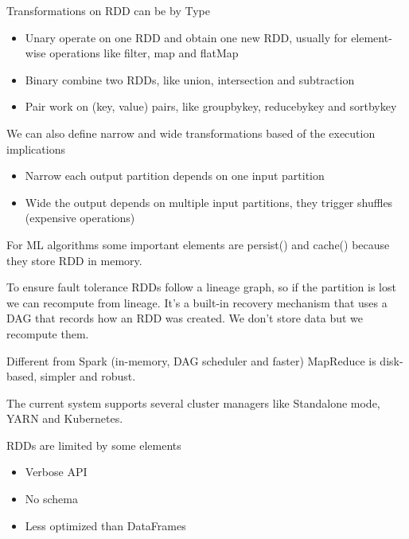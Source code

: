 \vspace{10pt}

Transformations on RDD can be by Type
\begin{itemize}
    \item Unary \ra operate on one RDD and obtain one new RDD, usually for element-wise operations like filter, map and flatMap
    \item Binary \ra combine two RDDs, like union, intersection and subtraction
    \item Pair \ra work on (key, value) pairs, like groupbykey, reducebykey and sortbykey
\end{itemize}

We can also define narrow and wide transformations based of the execution implications

\begin{itemize}
    \item Narrow \ra each output partition depends on one input partition
    \item Wide \ra the output depends on multiple input partitions, they trigger shuffles (expensive operations)
\end{itemize}


For ML algorithms some important elements are persist() and cache() because they store RDD in memory. 

\vspace{10pt}

To ensure fault tolerance RDDs follow a lineage graph, so if the partition is lost we can recompute from lineage. It's a built-in recovery mechanism that uses a DAG that records how an RDD was created. We don't store data but we recompute them.

\vspace{10pt}

Different from Spark (in-memory, DAG scheduler and faster) MapReduce is disk-based, simpler and robust.

\vspace{10pt}

The current system supports several cluster managers like Standalone mode, YARN and Kubernetes.

\vspace{10pt}

RDDs are limited by some elements 
\begin{itemize}
    \item Verbose API
    \item No schema
    \item Less optimized than DataFrames
\end{itemize}

